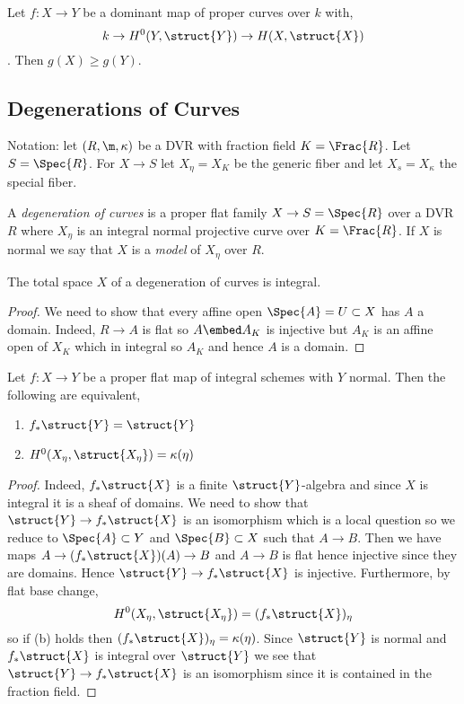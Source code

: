 \documentclass[12pt]{article}
\begin{document}
\begin{prop}
Let $f : X \to Y$ be a dominant map of proper curves over $k$ with,
\[ k \to H^0(Y, \struct{Y}) \to H(X, \struct{X}) \]
. Then $g(X) \ge g(Y)$.
\end{prop}

\subsection{Degenerations of Curves}

Notation: let $(R, \m, \kappa)$ be a DVR with fraction field $K = \Frac{R}$. Let $S = \Spec{R}$. For $X \to S$ let $X_\eta = X_K$ be the generic fiber and let $X_s = X_\kappa$ the special fiber.

\begin{defn}
A \textit{degeneration of curves} is a proper flat family $X \to S = \Spec{R}$ over a DVR $R$ where $X_\eta$ is an integral normal projective curve over $K = \Frac{R}$. If $X$ is normal we say that $X$ is a \textit{model} of $X_\eta$ over $R$.
\end{defn}

\begin{lemma}
The total space $X$ of a degeneration of curves is integral.
\end{lemma}

\begin{proof}
We need to show that every affine open $\Spec{A} = U \subset X$ has $A$ a domain. Indeed, $R \to A$ is flat so $A \embed A_K$ is injective but $A_K$ is an affine open of $X_K$ which in integral so $A_K$ and hence $A$ is a domain.
\end{proof}

\begin{lemma} \label{lemma:normal_o_conn}
Let $f : X \to Y$ be a proper flat map of integral schemes with $Y$ normal. Then the following are equivalent,
\begin{enumerate}
\item $f_* \struct{Y} = \struct{Y}$
\item $H^0(X_\eta, \struct{X_\eta}) = \kappa(\eta)$
\end{enumerate}
\end{lemma}

\begin{proof}
Indeed, $f_* \struct{X}$ is a finite $\struct{Y}$-algebra and since $X$ is integral it is a sheaf of domains. We need to show that $\struct{Y} \to f_* \struct{X}$ is an isomorphism which is a local question so we reduce to $\Spec{A} \subset Y$ and $\Spec{B} \subset X$ such that $A \to B$. Then we have maps $A \to (f_* \struct{X})(A) \to B$ and $A \to B$ is flat hence injective since they are domains. Hence $\struct{Y} \to f_* \struct{X}$ is injective. Furthermore, by flat base change,
\[ H^0(X_\eta, \struct{X_\eta}) = (f_* \struct{X})_{\eta} \]
so if (b) holds then $(f_* \struct{X})_{\eta} = \kappa(\eta)$. Since $\struct{Y}$ is normal and $f_* \struct{X}$ is integral over $\struct{Y}$ we see that $\struct{Y} \to f_* \struct{X}$ is an isomorphism since it is contained in the fraction field.
\end{proof}
\end{document}
